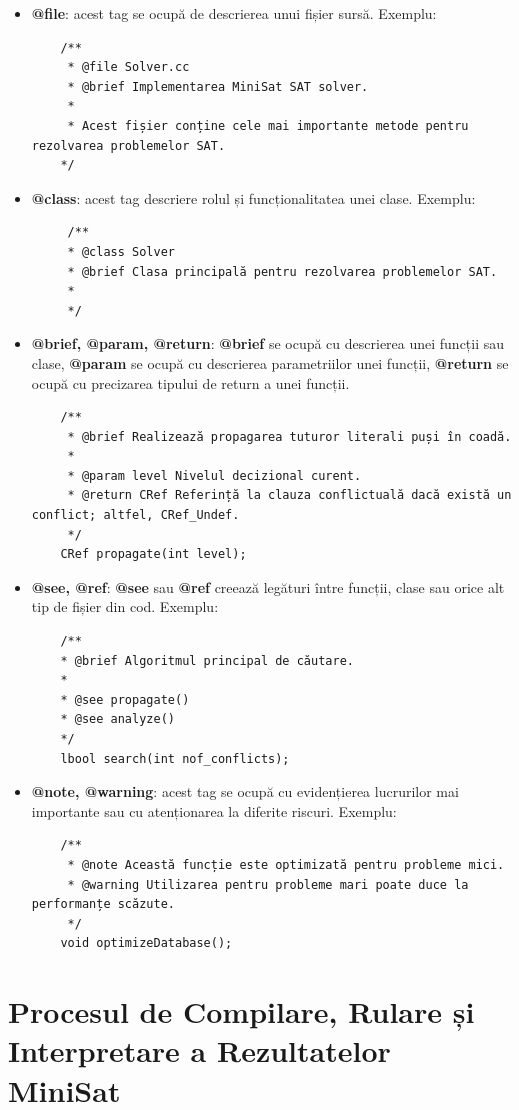 \documentclass[runningheads]{llncs}
\begin{document}
\begin{itemize}
    \item \textbf{@file}: acest tag se ocupă de descrierea unui fișier sursă. Exemplu: 
    \begin{verbatim}
    /**
     * @file Solver.cc
     * @brief Implementarea MiniSat SAT solver.
     * 
     * Acest fișier conține cele mai importante metode pentru rezolvarea problemelor SAT.
    */
    \end{verbatim}
    \item \textbf{@class}: acest tag descriere rolul și funcționalitatea unei clase.
    Exemplu:
    \begin{verbatim}
     /**
     * @class Solver
     * @brief Clasa principală pentru rezolvarea problemelor SAT.
     * 
     */
    \end{verbatim}
    \item \textbf{@brief, @param, @return}: \textbf{@brief} se ocupă cu descrierea unei funcții sau clase, \textbf{@param} se ocupă cu descrierea parametriilor unei funcții, \textbf{@return} se ocupă cu precizarea tipului de return a unei funcții.
    \begin{verbatim}
    /**
     * @brief Realizează propagarea tuturor literali puși în coadă.
     * 
     * @param level Nivelul decizional curent.
     * @return CRef Referință la clauza conflictuală dacă există un conflict; altfel, CRef_Undef.
     */
    CRef propagate(int level);
    \end{verbatim}
    \item \textbf{@see, @ref}: \textbf{@see} sau \textbf{@ref} creează legături între funcții, clase sau orice alt tip de fișier din cod.
    Exemplu:
    \begin{verbatim}
    /**
    * @brief Algoritmul principal de căutare.
    * 
    * @see propagate()
    * @see analyze()
    */
    lbool search(int nof_conflicts);
    \end{verbatim}
    \item \textbf{@note, @warning}: acest tag se ocupă cu evidențierea lucrurilor mai importante sau cu atenționarea la diferite riscuri.
    Exemplu:
    \begin{verbatim}
    /**
     * @note Această funcție este optimizată pentru probleme mici.
     * @warning Utilizarea pentru probleme mari poate duce la performanțe scăzute.
     */
    void optimizeDatabase();
    \end{verbatim}
\end{itemize}
\section{Procesul de Compilare, Rulare și Interpretare a Rezultatelor MiniSat}
\end{document}

